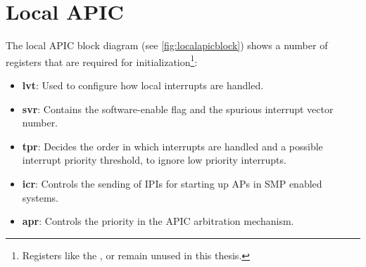 %
%

\clearpage

\section{Local APIC}
\label{sec:lapicinit}

The local APIC block diagram (see \autoref{fig:localapicblock}) shows a number of registers that are required for initialization\footnote{
  Registers like the ,  or  remain unused in this thesis.}:

\begin{itemize}
  \item \textbf{\gls{lvt}}: Used to configure how local interrupts are handled.
  \item \textbf{\gls{svr}}: Contains the software-enable flag and the spurious interrupt vector number.
  \item \textbf{\gls{tpr}}: Decides the order in which interrupts are handled and a possible interrupt priority threshold, to ignore low priority interrupts.
  \item \textbf{\gls{icr}}: Controls the sending of IPIs for starting up APs in SMP enabled systems.
  \item \textbf{\gls{apr}}: Controls the priority in the APIC arbitration mechanism.
\end{itemize}


